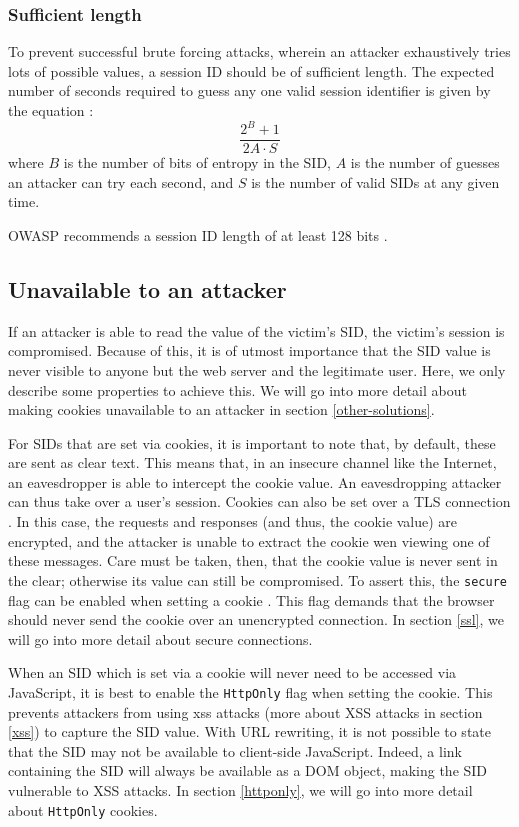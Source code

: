 \subsubsection{Sufficient length}
To prevent successful brute forcing attacks, wherein an attacker exhaustively tries lots of possible values, a session ID should be of sufficient length. The expected number of seconds required to guess any one valid session identifier is given by the equation \cite{OWASP2009a}:
\[
	\frac{2^B + 1}{2A \cdot S}
\]
where $B$ is the number of bits of entropy in the SID, $A$ is the number of guesses an attacker can try each second, and $S$ is the number of valid SIDs at any given time.

OWASP recommends a session ID length of at least 128 bits \cite{OWASP2009a}.

\subsection{Unavailable to an attacker}
If an attacker is able to read the value of the victim's SID, the victim's session is compromised. Because of this, it is of utmost importance that the SID value is never visible to anyone but the web server and the legitimate user. Here, we only describe some properties to achieve this. We will go into more detail about making cookies unavailable to an attacker in section \ref{other-solutions}.

For SIDs that are set via cookies, it is important to note that, by default, these are sent as clear text. This means that, in an insecure channel like the Internet, an eavesdropper is able to intercept the cookie value. An eavesdropping attacker can thus take over a user's session. Cookies can also be set over a TLS connection \cite{rfc2818}. In this case, the requests and responses (and thus, the cookie value) are encrypted, and the attacker is unable to extract the cookie wen viewing one of these messages. Care must be taken, then, that the cookie value is never sent in the clear; otherwise its value can still be compromised. To assert this, the \texttt{secure} flag can be enabled when setting a cookie \cite{Fu2001, rfc2109}. This flag demands that the browser should never send the cookie over an unencrypted connection. In section \ref{ssl}, we will go into more detail about secure connections.

When an SID which is set via a cookie will never need to be accessed via JavaScript, it is best to enable the \texttt{HttpOnly} flag when setting the cookie. This prevents attackers from using \gls{xss} attacks (more about XSS attacks in section \ref{xss}) to capture the SID value. With URL rewriting, it is not possible to state that the SID may not be available to client-side JavaScript. Indeed, a link containing the SID will always be available as a DOM object, making the SID vulnerable to XSS attacks. In section \ref{httponly}, we will go into more detail about \texttt{HttpOnly} cookies.

